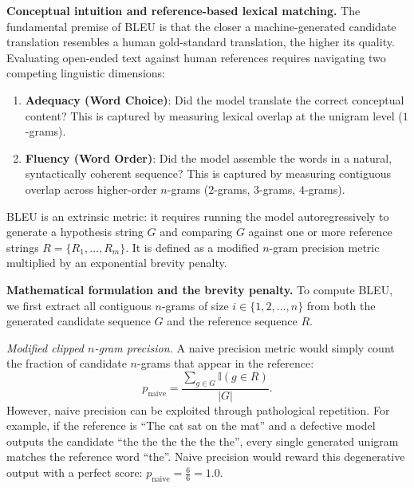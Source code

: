\documentclass[../../main.tex]{subfiles}
\begin{document}
\noindent\textbf{Conceptual intuition and reference-based lexical matching.}\newline
The fundamental premise of BLEU is that the closer a machine-generated candidate translation resembles a human gold-standard translation, the higher its quality. Evaluating open-ended text against human references requires navigating two competing linguistic dimensions:
\begin{enumerate}
    \item \textbf{Adequacy (Word Choice)}: Did the model translate the correct conceptual content? This is captured by measuring lexical overlap at the unigram level ($1$-grams).
    \item \textbf{Fluency (Word Order)}: Did the model assemble the words in a natural, syntactically coherent sequence? This is captured by measuring contiguous overlap across higher-order $n$-grams ($2$-grams, $3$-grams, $4$-grams).
\end{enumerate}

BLEU is an extrinsic metric: it requires running the model autoregressively to generate a hypothesis string $G$ and comparing $G$ against one or more reference strings $R = \{R_1, \dots, R_m\}$. It is defined as a modified $n$-gram precision metric multiplied by an exponential brevity penalty.

\noindent\textbf{Mathematical formulation and the brevity penalty.}\newline
To compute BLEU, we first extract all contiguous $n$-grams of size $i \in \{1, 2, \dots, n\}$ from both the generated candidate sequence $G$ and the reference sequence $R$.

\textit{Modified clipped $n$-gram precision.} A naive precision metric would simply count the fraction of candidate $n$-grams that appear in the reference:
\begin{equation*}
p_{\text{naive}} = \frac{\sum_{g \in G} \mathbb{I}(g \in R)}{|G|}.
\end{equation*}
However, naive precision can be exploited through pathological repetition. For example, if the reference is ``The cat sat on the mat'' and a defective model outputs the candidate ``the the the the the the'', every single generated unigram matches the reference word ``the''. Naive precision would reward this degenerative output with a perfect score: $p_{\text{naive}} = \frac{6}{6} = 1.0$.
\end{document}
